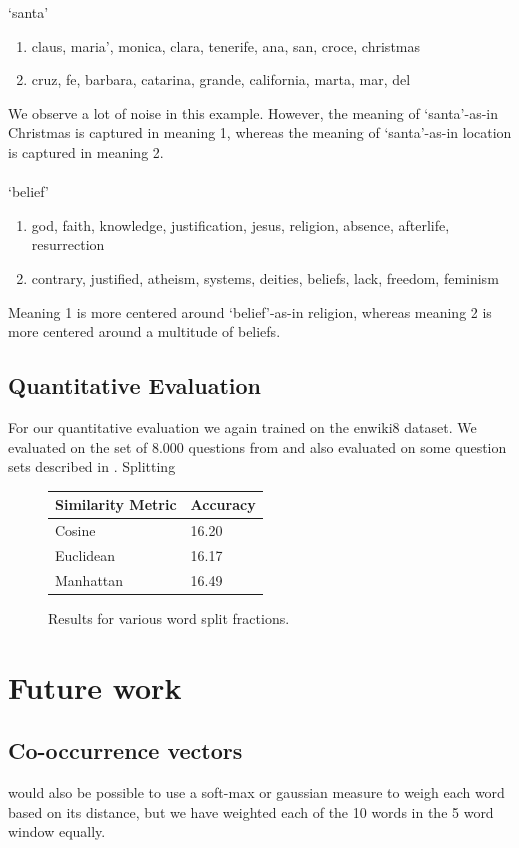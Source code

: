 \documentclass[11pt]{article}
\begin{document}
`santa'
\begin{enumerate}
\item claus, maria', monica, clara, tenerife, ana, san, croce, christmas
\item cruz, fe, barbara, catarina, grande, california, marta, mar, del
\end{enumerate}
We observe a lot of noise in this example. However, the meaning of `santa'-as-in Christmas is captured in meaning 1, whereas the meaning of `santa'-as-in location is captured in meaning 2. \\\\
`belief'
\begin{enumerate}
\item god, faith, knowledge, justification, jesus, religion, absence, afterlife, resurrection
\item contrary, justified, atheism, systems, deities, beliefs, lack, freedom, feminism
\end{enumerate}
Meaning 1 is more centered around `belief'-as-in religion, whereas meaning 2 is more centered around a multitude of beliefs. 

\subsection{Quantitative Evaluation}
For our quantitative evaluation we again trained on the enwiki8 dataset. We evaluated on the set of $8.000$ questions from \cite{Mikolov:13} and also evaluated on some question sets described in \cite{Mikolov:13c}. Splitting 

\begin{figure}[H]
\center
    \begin{tabular}{l|l}
    \textbf{Similarity Metric} & \textbf{Accuracy}  \\ \hline
    Cosine            & 16.20     \\ \hline
    Euclidean         & 16.17     \\ \hline
    Manhattan         & 16.49     \\
    \end{tabular}
    \caption{Results for various word split fractions.}
    \label{metric1}
\end{figure}




\section{Future work}
\subsection{Co-occurrence vectors}
would also be possible to use a soft-max or gaussian measure to weigh each word based on its distance, but we have weighted each of the 10 words in the 5 word window equally.
\end{document}
